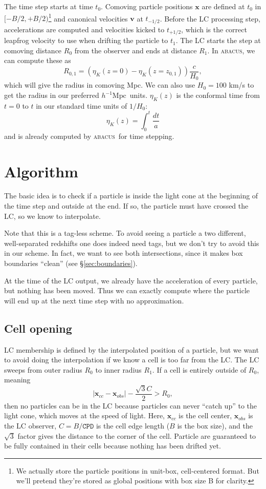 \documentclass[a4paper]{article}
\newcommand{\abacus}{\textsc{abacus}\xspace}
\newcommand{\bfx}{\ensuremath{\mathbf{x}}}
\newcommand{\bfv}{\ensuremath{\mathbf{v}}}
\newcommand{\CPD}{\ensuremath{\mathtt{CPD}}}
\newcommand{\hMpc}{\ensuremath{{h^{-1}\mathrm{Mpc}}}}
\begin{document}
The time step starts at time $t_0$.  Comoving particle positions $\bfx$ are defined at $t_0$ in $[-B/2,+B/2)$\footnote{We actually store the particle positions in unit-box, cell-centered format.  But we'll pretend they're stored as global positions with box size B for clarity.} and canonical velocities $\bfv$ at $t_{-1/2}$.  Before the LC processing step, accelerations are computed and velocities kicked to $t_{+1/2}$, which is the correct leapfrog velocity to use when drifting the particle to $t_1$.  The LC starts the step at comoving distance $R_0$ from the observer and ends at distance $R_1$.  In \abacus, we can compute these as
\begin{equation}
R_{0,1} = (\eta_K(z=0) - \eta_K(z=z_{0,1}))\frac{c}{H_0},
\end{equation}
which will give the radius in comoving Mpc.  We can also use $H_0 = 100$ km/s to get the radius in our preferred \hMpc\ units.  $\eta_K(z)$ is the conformal time from $t=0$ to $t$ in our standard time units of $1/H_0$:
\begin{equation}\label{eq:eta_K}
\eta_K(z) = \int_0^t\frac{dt}{a}
\end{equation}
and is already computed by \abacus\ for time stepping.

\section{Algorithm}
The basic idea is to check if a particle is inside the light cone at the beginning of the time step and outside at the end.  If so, the particle must have crossed the LC, so we know to interpolate.

Note that this is a tag-less scheme.  To avoid seeing a particle a two different, well-separated redshifts one does indeed need tags, but we don't try to avoid this in our scheme.  In fact, we want to see both intersections, since it makes box boundaries ``clean''  (see \S\ref{sec:boundaries}).

At the time of the LC output, we already have the acceleration of every particle, but nothing has been moved.  Thus we can exactly compute where the particle will end up at the next time step with no approximation.

\subsection{Cell opening}
LC membership is defined by the interpolated position of a particle, but we want to avoid doing the interpolation if we know a cell is too far from the LC.  The LC sweeps from outer radius $R_0$ to inner radius $R_1$.  If a cell is entirely outside of $R_0$, meaning
\begin{equation}
|\bfx_{cc} - \bfx_{obs}| - \frac{\sqrt{3}C}{2} > R_0,
\end{equation}
then no particles can be in the LC because particles can never ``catch up'' to the light cone, which moves at the speed of light.  Here, $\bfx_{cc}$ is the cell center, $\bfx_{obs}$ is the LC observer, $C = B/\CPD$ is the cell edge length ($B$ is the box size), and the $\sqrt{3}$ factor gives the distance to the corner of the cell.  Particle are guaranteed to be fully contained in their cells because nothing has been drifted yet.
\end{document}
